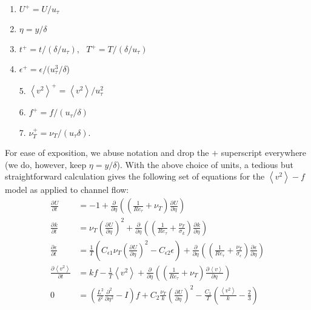 \documentclass[a4paper,11pt]{article}
\newcommand{\chevron}[1]{\left\langle #1 \right\rangle}
\newcommand{\pderiv}[3][]{%
  \ensuremath{\frac{\partial^{#1} {#2}}{\partial {#3}^{#1}}}}
\newcommand{\ep}{\epsilon}
\begin{document}
\begin{multicols}{2}
\begin{enumerate}
\item $U^+ = U\big/u_{\tau}$
\item $\eta  = y\Big/\delta$
\item $t^+ = t\Big/(\delta/u_{\tau}), \,\,\,\, T^+ = T\Big/(\delta/u_{\tau})$
\item $\epsilon^+ = \epsilon\Big/(u_{\tau}^3/\delta$)
\end{enumerate}
\columnbreak 

\begin{itemize}
\item[5.] $\chevron{v^2}^+ = \chevron{v^2}\Big/u_{\tau}^2$
\item[6.] $f^+ = f\Big/(u_{\tau}/\delta)$
\item[7.] $\nu_T^+ = \nu_T\Big/(u_{\tau} \delta)$.

\end{itemize}
\end{multicols}
For ease of exposition, we abuse notation and drop the $+$ superscript everywhere (we do, however, keep $\eta = y/\delta$). With the above choice of units, a tedious but straightforward calculation gives the following set of equations for the $\chevron{v^2}-f$ model as applied to channel flow: 
\begin{align}
	\label{eq:ssv2f1_nondim}
        \pderiv{U}{t} &= -1 +
\pderiv{}{\eta}\left(\left(\frac{1}{Re_{\tau}}+\nu_T\right)\pderiv{U}{\eta}\right) \\
        \pderiv{k}{t} &= \nu_T\left(\pderiv{U}{\eta}\right)^2 + 
\pderiv{}{\eta}\left(\left(\frac{1}{Re_{\tau}}+\frac{\nu_T}{\sigma_k}\right)\pderiv{k}{\eta}\right) \\
        \pderiv{\ep}{t} &= \frac{1}{T}\left(C_{\ep
1}\nu_T\left(\pderiv{U}{\eta}\right)^2 - C_{\ep 2}\ep\right) + 
\pderiv{}{\eta}\left(\left(\frac{1}{Re_{\tau}}+\frac{\nu_T}{\sigma_\ep}\right)\pderiv{\ep}{\eta}\right) \\
        \pderiv{\chevron{v^2}}{t} &= kf - \frac{1}{T}\chevron{v^2} +
\pderiv{}{\eta}\left(\left(\frac{1}{Re_{\tau}}+\nu_T\right)\pderiv{\chevron{v}}{\eta}\right) \\
        0 &= \left( \frac{L^2}{\delta^2} \frac{\partial^2}{\partial \eta^2} - I\right)f +
C_2\frac{\nu_T}{k}\left(\pderiv{U}{\eta}\right)^2 -
\frac{C_1}{T}\left(\frac{\chevron{v^2}}{k}-\frac{2}{3}\right)
	\label{eq:ssv2f5_nondim}
\end{align}
\end{document}
